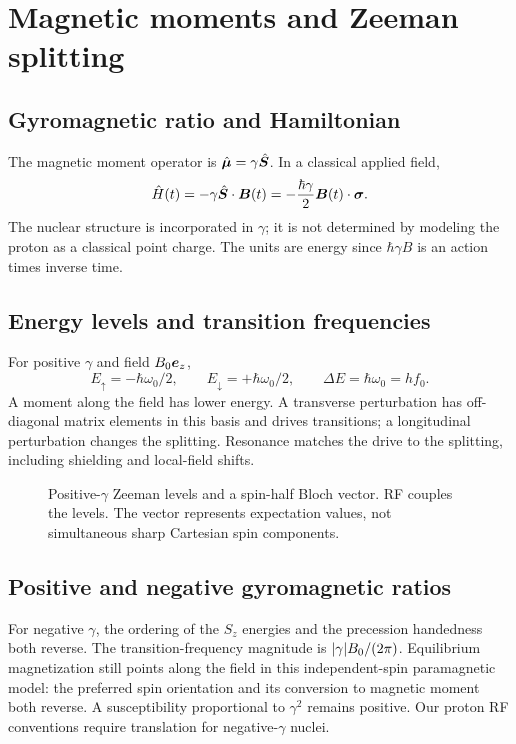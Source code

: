 \section{Magnetic moments and Zeeman splitting}
\label{sec:02:magnetic-moments-and-zeeman-splitting}
\subsection{Gyromagnetic ratio and Hamiltonian}
The magnetic moment operator is $\hat{\bm{\mu}}=\gamma\hat{\bm{S}}$.
In a classical applied field,
\begin{equation}
 \hat{H}(t)=-\gamma\hat{\bm{S}}\cdot\bm{B}(t)
         =-\frac{\hbar\gamma}{2}\bm{B}(t)\cdot\bm{\sigma} .
 \label{eq:02:zeeman}
\end{equation}
The nuclear structure is incorporated in $\gamma$; it is not determined
by modeling the proton as a classical point charge. The units are energy
since $\hbar\gamma B$ is an action times inverse time.

\subsection{Energy levels and transition frequencies}
For positive $\gamma$ and field $B_0\bm{e}_z$,
\[
 E_\uparrow=-\hbar\omega_0/2,\qquad E_\downarrow=+\hbar\omega_0/2,
 \qquad \Delta E=\hbar\omega_0=hf_0 .
\]
A moment along the field has lower energy. A transverse perturbation
has off-diagonal matrix elements in this basis and drives transitions;
a longitudinal perturbation changes the splitting. Resonance matches
the drive to the splitting, including shielding and local-field shifts.

\begin{figure}[tb]
 \centering
 \caption{Positive-$\gamma$ Zeeman levels and a spin-half Bloch vector.
 RF couples the levels. The vector represents expectation values, not
 simultaneous sharp Cartesian spin components.}
 \label{fig:02:zeeman}
\end{figure}

\subsection{Positive and negative gyromagnetic ratios}
For negative $\gamma$, the ordering of the $S_z$ energies and the
precession handedness both reverse. The transition-frequency magnitude
is $\lvert\gamma\rvert B_0/(2\pi)$. Equilibrium magnetization still points along
the field in this independent-spin paramagnetic model: the preferred
spin orientation and its conversion to magnetic moment both reverse.
A susceptibility proportional to $\gamma^2$ remains positive.
Our proton RF conventions require translation for negative-$\gamma$
nuclei.

